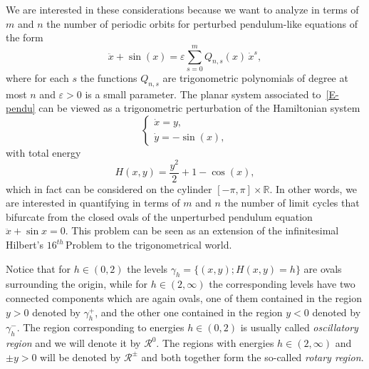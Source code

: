 \documentclass[12pt,psamsfonts]{amsart}
\begin{document}
We are interested in these considerations  because we want to  analyze in terms of
$m$ and $n$ the number of periodic orbits for perturbed pendulum-like equations of the form
\begin{equation}
\label{E-pendu}
    \ddot x+\sin(x)= {\varepsilon} \sum_{{s}=0}^{m}{Q_{n,{s}} (x)\, \dot x^{s}},
\end{equation}
where for each $s$ the functions $Q_{n,s}$ are trigonometric polynomials of degree at most $n$
and ${\varepsilon}>0$ is a small parameter.
 The planar system  associated to~\eqref{E-pendu} can be viewed as a trigonometric
 perturbation  of the  Hamiltonian  system
\begin{equation}
\label{E-HamSys}
     {
  \left\{\!
   \begin{array}{l}
    \dot x={y,} \\[2pt] \dot y={-\sin(x),}
   \end{array}
  \right.
}
\end{equation}
with total energy
\begin{equation}
\label{E-Hamiltonian}
    H(x,y)= \frac{y^2}{2} +1-\cos(x),
\end{equation}
which in fact can be considered on the cylinder  $ [-\pi,\pi]\times {\mathbb{R}}$. In other words, we are
interested  in quantifying in terms of $m$ and $n$  the number of limit cycles  that bifurcate
from the closed ovals of the unperturbed pendulum equation $\ddot x+\sin x=0.$ This problem  can
be seen as an extension of the infinitesimal Hilbert's $16^{th}\,$Problem to the trigonometrical
world.

Notice that for $h\in(0,2)$ the levels $\gamma_h=\{(x,y);H(x,y)=h\}$ are ovals surrounding the
origin, while for $h\in (2,\infty)$ the corresponding levels have two connected components which
are again ovals, one of them contained in the region $y>0$ denoted by $\gamma_h^+$, and the other
one contained in the region $y<0$ denoted by $\gamma_h^-.$ The region corresponding to energies
$h\in(0,2)$ is usually called {\it oscillatory region} and we will denote it by $\mathcal{R}^0.$
The regions with energies $h\in(2,\infty)$ and $\pm y>0$ will be denoted  by $\mathcal{R}^\pm$ and
both together form the so-called {\it rotary region}.\\
\end{document}
